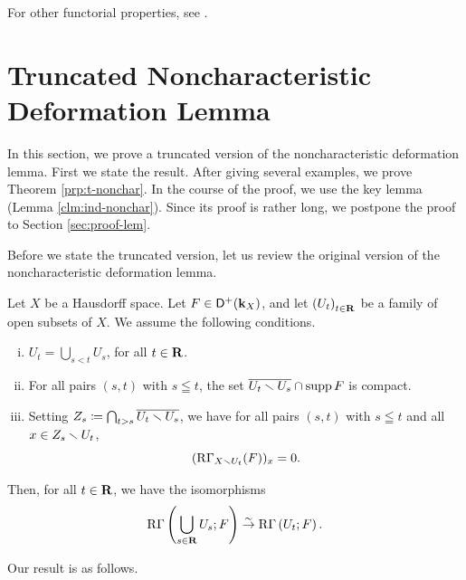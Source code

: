 For other functorial properties, see \cite{KMS03a,FM07}. 


\section{Truncated Noncharacteristic Deformation Lemma}\label{sec:t-nonchar}

In this section, we prove a truncated version of 
the noncharacteristic deformation lemma. 
First we state the result. 
After giving several examples, 
we prove Theorem \ref{prp:t-nonchar}. 
In the course of the proof, 
we use the key lemma (Lemma \ref{clm:ind-nonchar}). 
Since its proof is rather long, 
we postpone the proof to Section \ref{sec:proof-lem}. 


Before we state the truncated version, let us review the original 
version of the noncharacteristic deformation lemma.   
\begin{Proposition+}[{\cite[Proposition 2.7.2]{KS90}}]\label{prp:nonchar}
  Let \(X\) be a Hausdorff space. 
  Let \(F\in\mathop{\mathsf{D}^\mathrm{+}}\nolimits(\mathbf{k}_X)\), and let
  \(\left(U_{t}\right)_{t\in\mathbf{R}}\) be a family of 
  open subsets of \(X\). 
  We assume the following conditions. 
  \begin{enumerate}[(i)]
    \item \label{item:nonchar1}
    \(U_{t}=\bigcup_{s<t}U_{s}\), for all \(t\in\mathbf{R}\). 
    \item \label{item:nonchar2}
    For all pairs \((s,t)\) with \(s\leqq t\), 
    the set \(\overline{U_{t}\smallsetminus U_{s}}\cap \mathop{\mathrm{supp}}\nolimits{F}\) is compact.
    \item \label{item:nonchar3}
    Setting \(
      Z_{s}\coloneqq \bigcap_{t>s}\overline{U_t\smallsetminus U_s}
    \), we have
    for all pairs \((s,t)\) with \(s\leqq t\) and 
    all \(x\in Z_{s}\smallsetminus U_{t}\), 
    \[
      (\mathop{\mathrm{R}\hspace{-0pt}\Gamma}\nolimits_{X\smallsetminus U_{t}}(F))_{x}=0.
    \]
  \end{enumerate}
  Then, for all \(t\in\mathbf{R}\), we have the isomorphisms\[
    \mathop{\mathrm{R}\hspace{-0pt}\Gamma}\nolimits\left(\bigcup_{s\in\mathbf{R}}U_{s};F\right)
    \mathrel{\overset{\sim}{\rightarrow}} 
    \mathop{\mathrm{R}\hspace{-0pt}\Gamma}\nolimits\left(U_{t};F\right).
  \]
\end{Proposition+}

Our result is as follows. 

